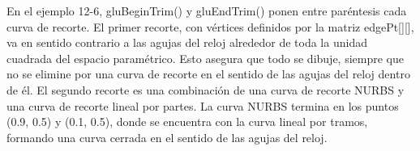 \documentclass[]{article}
\begin{document}
En el ejemplo 12-6, gluBeginTrim() y gluEndTrim() ponen entre paréntesis cada curva de recorte. El primer recorte, con vértices definidos por la matriz edgePt[][], va en sentido contrario a las agujas del reloj alrededor de toda la unidad cuadrada del espacio paramétrico. Esto asegura que todo se dibuje, siempre que no se elimine por una curva de recorte en el sentido de las agujas del reloj dentro de él. El segundo recorte es una combinación de una curva de recorte NURBS y una curva de recorte lineal por partes. La curva NURBS termina en los puntos (0.9, 0.5) y (0.1, 0.5), donde se encuentra con la curva lineal por tramos, formando una curva cerrada en el sentido de las agujas del reloj.
\end{document}

